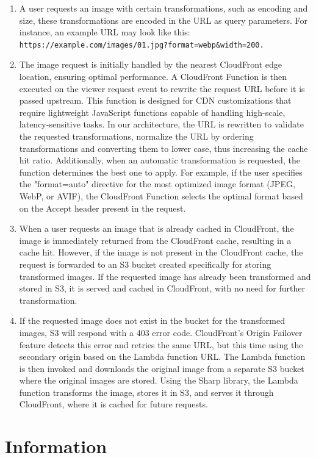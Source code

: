 \documentclass{article}
\begin{document}
\begin{enumerate}
  \item A user requests an image with certain transformations, such as encoding and size, these transformations are encoded in the URL as query parameters. For instance, an example URL may look like this: \lstinline{https://example.com/images/01.jpg?format=webp&width=200.}
  \item The image request is initially handled by the nearest CloudFront edge location, ensuring optimal performance. A CloudFront Function is then executed on the viewer request event to rewrite the request URL before it is passed upstream. This function is designed for CDN customizations that require lightweight JavaScript functions capable of handling high-scale, latency-sensitive tasks. In our architecture, the URL is rewritten to validate the requested transformations, normalize the URL by ordering transformations and converting them to lower case, thus increasing the cache hit ratio. Additionally, when an automatic transformation is requested, the function determines the best one to apply. For example, if the user specifies the "format=auto" directive for the most optimized image format (JPEG, WebP, or AVIF), the CloudFront Function selects the optimal format based on the Accept header present in the request.
  \item When a user requests an image that is already cached in CloudFront, the image is immediately returned from the CloudFront cache, resulting in a cache hit. However, if the image is not present in the CloudFront cache, the request is forwarded to an S3 bucket created specifically for storing transformed images. If the requested image has already been transformed and stored in S3, it is served and cached in CloudFront, with no need for further transformation.
  \item If the requested image does not exist in the bucket for the transformed images, S3 will respond with a 403 error code. CloudFront's Origin Failover feature detects this error and retries the same URL, but this time using the secondary origin based on the Lambda function URL. The Lambda function is then invoked and downloads the original image from a separate S3 bucket where the original images are stored. Using the Sharp library, the Lambda function transforms the image, stores it in S3, and serves it through CloudFront, where it is cached for future requests.
\end{enumerate}

\section{Information}
\end{document}
